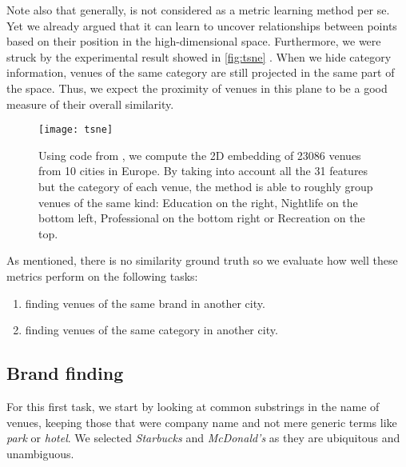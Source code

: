 Note also that generally, \tsne{} is not considered as a metric learning method
per se. Yet we already argued that it can learn to uncover relationships between
points based on their position in the high-dimensional space. Furthermore, we
were struck by the experimental result showed in \autoref{fig:tsne}
. When we hide
category information, venues of the same category are still projected in the
same part of the space. Thus, we expect the proximity of venues in this
plane to be a good measure of their overall similarity.

\begin{figure}[htpb]
	\centering
	\texttt{[image: tsne]}
	\caption[2D projection of European venues by t-SNE]{Using code from
		\cite{BarnesHut13}, we compute the 2D embedding of 23086 venues from 10 cities in
		Europe. By taking into account all the 31 features but the category of each
		venue, the method is able to roughly group venues of the same kind: Education
		on the right, Nightlife on the bottom left, Professional on the bottom right
	or Recreation on the top. \label{fig:tsne}}
\end{figure}

As mentioned, there is no similarity ground truth so we evaluate how well these
metrics perform on the following tasks:
\begin{enumerate}
	\item finding venues of the same brand in another city.
	\item finding venues of the same category in another city.
\end{enumerate}		

\subsection{Brand finding}
\label{sub:brand_finding}

For this first task, we start by looking at common substrings in the name of
venues, keeping those that were company name and not mere generic terms like
\emph{park} or \emph{hotel}. We selected \emph{Starbucks} and \emph{McDonald's}
as they are ubiquitous and unambiguous.


